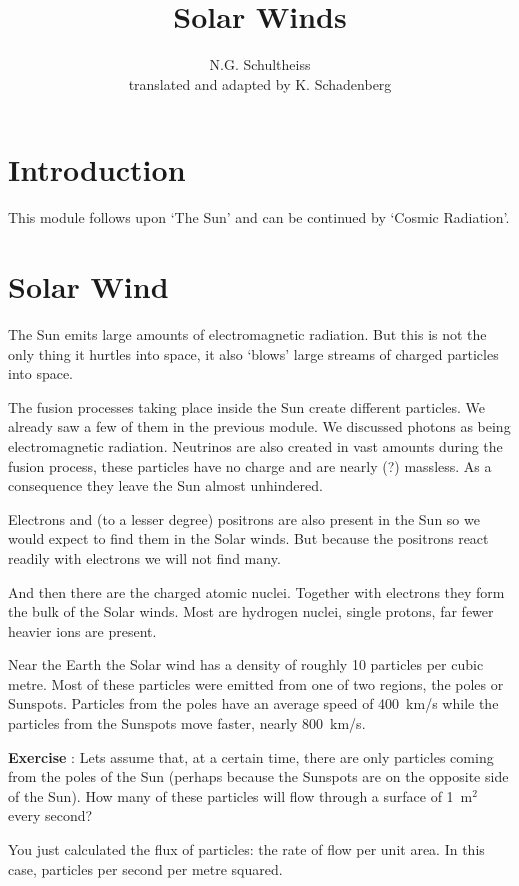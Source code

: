 \documentclass[12pt,a4paper]{article}
\author{N.G. Schultheiss \\ translated and adapted by K. Schadenberg}
\date{}
\title{Solar Winds}
\numberwithin{equation}{section}
\numberwithin{figure}{section}
\newcounter{Exercise}
\numberwithin{table}{section}
\begin{document}
\maketitle

\section{Introduction}
This module follows upon `The Sun' and can be continued by `Cosmic Radiation'.

\section{Solar Wind}
The Sun emits large amounts of electromagnetic radiation. But this is not the only thing it hurtles into space, it also `blows' large streams of charged particles into space.

The fusion processes taking place inside the Sun create different particles. We already saw a few of them in the previous module. We discussed photons as being electromagnetic radiation. Neutrinos are also created in vast amounts during the fusion process, these particles have no charge and are nearly (?) massless. As a consequence they leave the Sun almost unhindered.

Electrons and (to a lesser degree) positrons are also present in the Sun so we would expect to find them in the Solar winds. But because the positrons react readily with electrons we will not find many.

And then there are the charged atomic nuclei. Together with electrons they form the bulk of the Solar winds. Most are hydrogen nuclei, single protons, far fewer heavier ions are present.

Near the Earth the Solar wind has a density of roughly 10 particles per cubic metre. Most of these particles were emitted from one of two regions, the poles or Sunspots. Particles from the poles have an average speed of 400~km/s while the particles from the Sunspots move faster, nearly 800~km/s. 

\begin{shaded}
\textbf{Exercise \theExercise {}} : Lets assume that, at a certain time, there are only particles coming from the poles of the Sun (perhaps because the Sunspots are on the opposite side of the Sun). How many of these particles will flow through a surface of 1~m$^2$ every second?

You just calculated the flux of particles: the rate of flow per unit area. In this case, particles per second per metre squared.\end{shaded}
\end{document}
